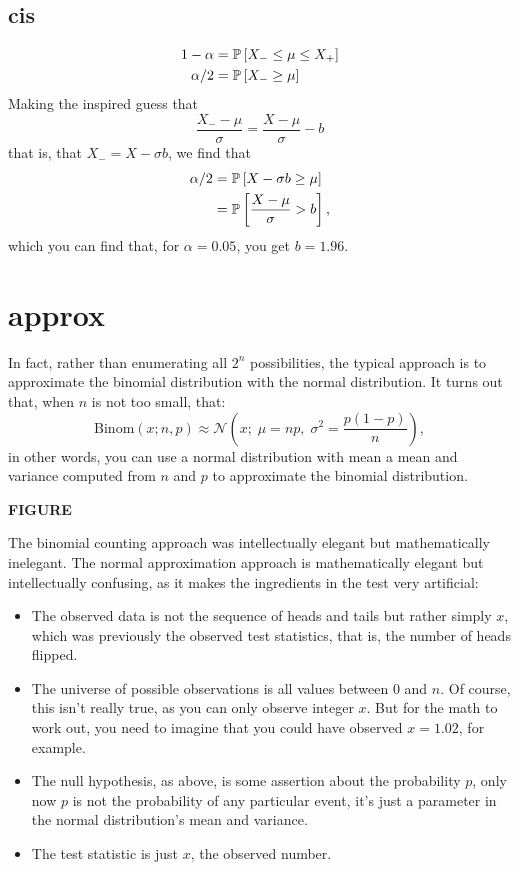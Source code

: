 \subsection{cis}

\begin{align}
1 - \alpha &= \mathbb{P}\left[{X_- \leq \mu \leq X_+}\right] \\
\alpha / 2 &= \mathbb{P}\left[{X_- \geq \mu}\right]
\end{align}
Making the inspired guess that
\begin{equation}
  \frac{X_- - \mu}{\sigma} = \frac{X - \mu}{\sigma} - b
\end{equation}
that is, that $X_- = X - \sigma b$, we find that
\begin{align}
  \alpha/2 &= \mathbb{P}\left[{X - \sigma b \geq \mu}\right] \\
  &= \mathbb{P}\left[{\frac{X - \mu}{\sigma} > b}\right],
\end{align}
which you can find that, for $\alpha = 0.05$, you get $b = 1.96$.


\section{approx}

In fact, rather than enumerating all $2^n$ possibilities, the typical approach
is to approximate the binomial distribution with the normal distribution. It turns out that, when $n$ is not too small, that:
\begin{equation}
    \mathrm{Binom}(x; n, p) \approx \mathcal{N}\left(x; \; \mu = np, \; \sigma^2 = \frac{p (1-p)}{n}\right),
\end{equation}
in other words, you can use a normal distribution with mean a mean and variance
computed from $n$ and $p$ to approximate the binomial distribution.

\textbf{FIGURE}

The binomial counting approach was intellectually elegant but mathematically
inelegant. The normal approximation approach is mathematically elegant but
intellectually confusing, as it makes the ingredients in the test very
artificial:
\begin{itemize}
    \item The observed data is not the sequence of heads and tails but rather simply $x$, which was previously the observed test statistics, that is, the number of heads flipped.
    \item The universe of possible observations is all values between $0$ and $n$. Of course, this isn't really true, as you can only observe integer $x$. But for the math to work out, you need to imagine that you could have observed $x = 1.02$, for example.
    \item The null hypothesis, as above, is some assertion about the probability $p$, only now $p$ is not the probability of any particular event, it's just a parameter in the normal distribution's mean and variance.
    \item The test statistic is just $x$, the observed number.
\end{itemize}


